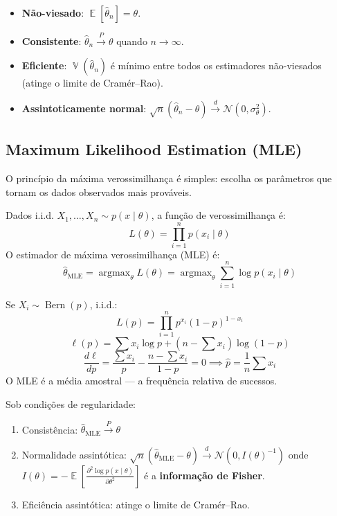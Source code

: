 \documentclass{tufte-handout}
\DeclareMathOperator*{\argmax}{argmax}
\DeclareMathOperator{\E}{\mathbb{E}}
\DeclareMathOperator{\Var}{\mathbb{V}}
\DeclareMathOperator{\Bern}{Bern}
\begin{document}
\begin{defn}
    \begin{itemize}
        \item \textbf{Não-viesado}: $\E[\hat{\theta}_n] = \theta$.
        \item \textbf{Consistente}: $\hat{\theta}_n \xrightarrow{P} \theta$ quando
        $n \to \infty$.
        \item \textbf{Eficiente}: $\Var(\hat{\theta}_n)$ é mínimo entre todos os
        estimadores não-viesados (atinge o limite de Cramér--Rao).
        \item \textbf{Assintoticamente normal}: $\sqrt{n}(\hat{\theta}_n - \theta) \xrightarrow{d} \mathcal{N}(0, \sigma^2_\theta)$.
    \end{itemize}
\end{defn}

\subsection{Maximum Likelihood Estimation (MLE)}

O princípio da máxima verossimilhança é simples: escolha os parâmetros que tornam os
dados observados mais prováveis.

\begin{defn}
    Dados i.i.d. $X_1, \dots, X_n \sim p(x \mid \theta)$, a função de verossimilhança é:
    \[
    L(\theta) = \prod_{i=1}^n p(x_i \mid \theta)
    \]
    O estimador de máxima verossimilhança (MLE) é:
    \[
    \hat{\theta}_{\text{MLE}} = \argmax_\theta L(\theta) = \argmax_\theta \sum_{i=1}^n \log p(x_i \mid \theta)
    \]
\end{defn}

\begin{exmp}
    Se $X_i \sim \Bern(p)$, i.i.d.:
    \[
    L(p) = \prod_{i=1}^n p^{x_i} (1-p)^{1-x_i}
    \]
    \[
    \ell(p) = \sum x_i \log p + (n - \sum x_i) \log(1-p)
    \]
    \[
    \frac{d\ell}{dp} = \frac{\sum x_i}{p} - \frac{n - \sum x_i}{1-p} = 0 \implies \hat{p} = \frac{1}{n}\sum x_i
    \]
    O MLE é a média amostral --- a frequência relativa de sucessos.
\end{exmp}

\begin{prop}
    Sob condições de regularidade:
    \begin{enumerate}
        \item Consistência: $\hat{\theta}_{\text{MLE}} \xrightarrow{P} \theta$
        \item Normalidade assintótica: $\sqrt{n}(\hat{\theta}_{\text{MLE}} - \theta) \xrightarrow{d} \mathcal{N}(0, I(\theta)^{-1})$
        onde $I(\theta) = -\E[\frac{\partial^2 \log p(x\mid\theta)}{\partial\theta^2}]$ é a
        \textbf{informação de Fisher}.
        \item Eficiência assintótica: atinge o limite de Cramér--Rao.
    \end{enumerate}
\end{prop}
\end{document}
